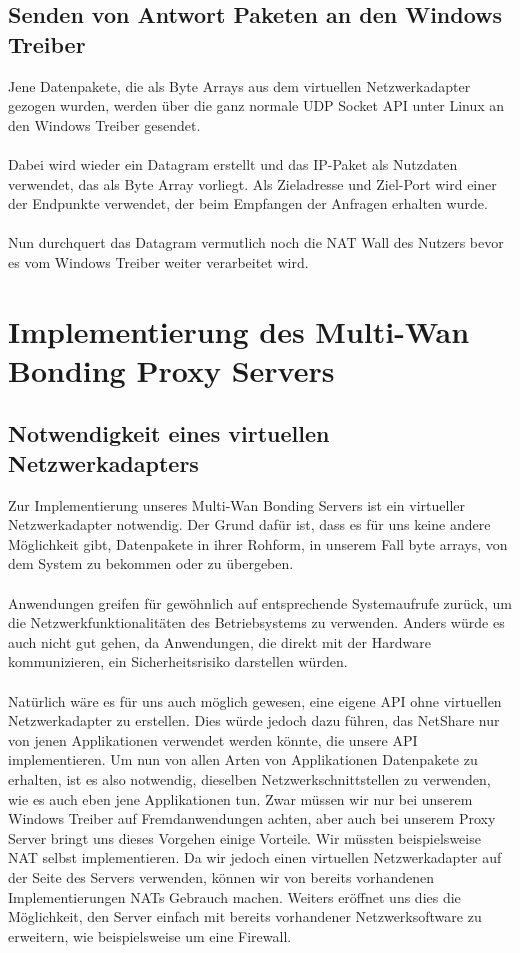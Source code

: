 \subsection{Senden von Antwort Paketen an den Windows Treiber}
Jene Datenpakete, die als Byte Arrays aus dem virtuellen Netzwerkadapter gezogen wurden, werden über die ganz normale UDP Socket API unter Linux an den Windows Treiber gesendet. 
\\\\
Dabei wird wieder ein Datagram erstellt und das IP-Paket als Nutzdaten verwendet, das als Byte Array vorliegt. Als Zieladresse und Ziel-Port wird einer der Endpunkte verwendet, der beim Empfangen der Anfragen erhalten wurde.
\\\\
Nun durchquert das Datagram vermutlich noch die NAT Wall des Nutzers bevor es vom Windows Treiber weiter verarbeitet wird. 


\section{Implementierung des Multi-Wan Bonding Proxy Servers}
\subsection{Notwendigkeit eines virtuellen Netzwerkadapters}
Zur Implementierung unseres Multi-Wan Bonding Servers ist ein virtueller Netzwerkadapter notwendig. Der Grund dafür ist, dass es für uns keine andere Möglichkeit gibt, Datenpakete in ihrer Rohform, in unserem Fall byte arrays, von dem System zu bekommen oder zu übergeben. 
\\\\
Anwendungen greifen für gewöhnlich auf entsprechende Systemaufrufe zurück, um die Netzwerkfunktionalitäten des Betriebsystems zu verwenden. Anders würde es auch nicht gut gehen, da Anwendungen, die direkt mit der Hardware kommunizieren, ein Sicherheitsrisiko darstellen würden.
\\\\
Natürlich wäre es für uns auch möglich gewesen, eine eigene API ohne virtuellen Netzwerkadapter zu erstellen. Dies würde jedoch dazu führen, das NetShare nur von jenen Applikationen verwendet werden könnte, die unsere API implementieren. Um nun von allen Arten von Applikationen Datenpakete zu erhalten, ist es also notwendig, dieselben Netzwerkschnittstellen zu verwenden, wie es auch eben jene Applikationen tun.  
\newpage
\noindent
Zwar müssen wir nur bei unserem Windows Treiber auf Fremdanwendungen achten, aber auch bei unserem Proxy Server bringt uns dieses Vorgehen einige Vorteile. Wir müssten beispielsweise NAT selbst implementieren. Da wir jedoch einen virtuellen Netzwerkadapter auf der Seite des Servers verwenden, können wir von bereits vorhandenen Implementierungen NATs Gebrauch machen. Weiters eröffnet uns dies die Möglichkeit, den Server einfach mit bereits vorhandener Netzwerksoftware zu erweitern, wie beispielsweise um eine Firewall.
